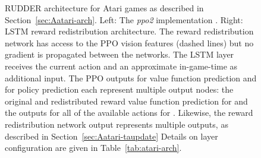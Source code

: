 \documentclass{article}
\newcommand{\figpath}{figures/}
\begin{document}
\begin{appendices}
\begin{figure}[htp]\centering \resizebox{0.5\textwidth}{0.5\textwidth}{}\caption{RUDDER architecture for Atari games as described in Section~\ref{sec:Aatari-arch}. 
 Left: The {\em ppo2} implementation \cite{Dhariwal:17}.
 Right: LSTM reward redistribution architecture.
 The reward redistribution network has access to the PPO vision features (dashed lines)
 but no gradient is propagated between the networks.
 The LSTM layer receives the current action and an approximate 
 in-game-time as additional input.
 The PPO outputs  for value function prediction and  for policy prediction each represent multiple output nodes: the original and redistributed reward value function prediction for  and the outputs for all of the available actions for .
 Likewise, the reward redistribution network output  represents multiple outputs, 
 as described in Section~\ref{sec:Aatari-taupdate}
 Details on layer configuration are given in Table~\ref{tab:atari-arch}.\label{fig:atari-arch}}\end{figure}


\end{appendices}
\end{document}
